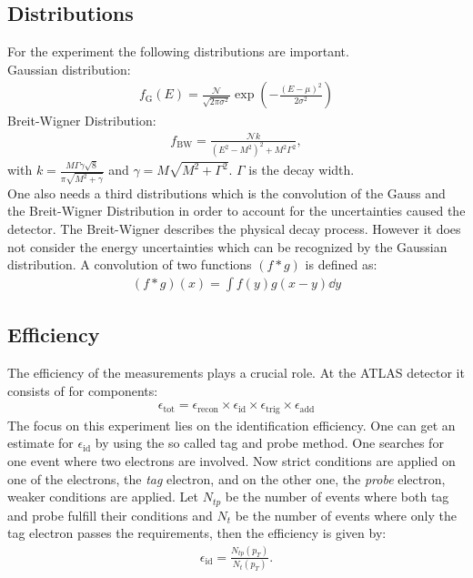 \documentclass[12pt, a4paper, bibliography=totoc]{scrartcl}
\begin{document}
\begin{multicols}{2}
\subsection{Distributions}
For the experiment the following distributions are important.\\
Gaussian distribution:
\begin{align}
    f_{\text{G}} (E) = \frac{\mathcal{N}}{\sqrt{2 \pi \sigma^2}} \exp \left( - \frac{(E - \mu )^2}{2 \sigma^2} \right)
\end{align}
Breit-Wigner Distribution:
\begin{align}
    f_{\text{BW}} = \frac{\mathcal{N} k}{(E^2 - M^2)^2 + M^2 \Gamma^2} ,
\end{align}
with $k = \frac{M\Gamma \gamma \sqrt{8}}{\pi \sqrt{M^2 + \gamma}}$ and $\gamma = M \sqrt{M^2 + \Gamma^2}$. $\Gamma$ is the decay width.\\
One also needs a third distributions which is the convolution of the Gauss and the Breit-Wigner Distribution in order to account for the uncertainties caused the detector.
The Breit-Wigner describes the physical decay process. 
However it does not consider the energy uncertainties which can be recognized by the Gaussian distribution.
A convolution of two functions $(f \ast g)$ is defined as:
\begin{align}
    (f \ast g) (x) = \int f(y)g(x-y)\dd y
\end{align}
\subsection{Efficiency}
The efficiency of the measurements plays a crucial role. 
At the ATLAS detector it consists of for components:
\begin{align}
     \epsilon_{\text{tot}} =  \epsilon_{\text{recon}} \times \epsilon_{\text{id}} \times \epsilon_{\text{trig}} \times \epsilon_{\text{add}} 
\end{align}
The focus on this experiment lies on the identification efficiency.
One can get an estimate for $\epsilon_{\text{id}}$ by using the so called tag and probe method.
One searches for one event where two electrons are involved. 
Now strict conditions are applied on one of the electrons, the \textit{tag} electron, 
and on the other one, the \textit{probe} electron, weaker conditions are applied.
Let $N_{tp}$ be the number of events where both tag and probe fulfill their conditions and $N_t$ be the number of events where only the tag electron passes the requirements, then the efficiency is given by:
\begin{align}
    \epsilon_{\text{id}} = \frac{N_{tp} (p_T)}{N_t(p_T)}.
\end{align}



\end{multicols}
\end{document}
